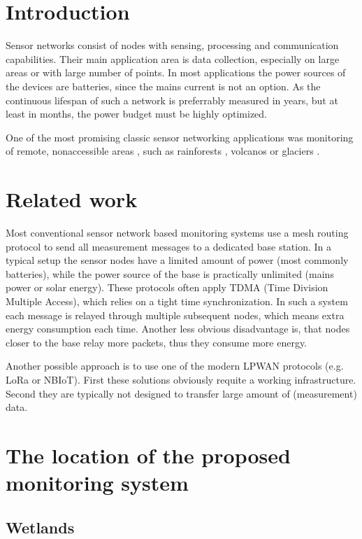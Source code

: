 \documentclass[conference]{IEEEtran}
\begin{document}
\section{Introduction}

Sensor networks consist of nodes with sensing, processing and communication
capabilities. Their main application area is data collection, especially
on large areas or with large number of points. In most applications
the power sources of the devices are batteries, since the mains current
is not an option. As the continuous lifespan of such a network is
preferrably measured in years, but at least in months, the power
budget must be highly optimized.

One of the most promising classic sensor networking applications was monitoring
of remote, nonaccessible areas \cite{corke2010}, such as rainforests
\cite{wark2008, cama2013}, volcanos \cite{werner2006, song2009} or glaciers
\cite{martinez2004, martinez2005}. 

\section{Related work}

Most conventional sensor network based monitoring
systems use a mesh routing protocol to
send all measurement messages to a dedicated base
station. In a typical setup the sensor nodes have
a limited amount of power (most commonly batteries),
while the power source of the base is practically
unlimited (mains power or solar energy). These protocols
often apply TDMA (Time Division Multiple Access),
which relies on a tight time synchronization.
In such a system each message is relayed through
multiple subsequent nodes, which means extra energy
consumption each time. Another less obvious
disadvantage is, that nodes closer to the base
relay more packets, thus they consume more energy.

Another possible approach is to use one of the
modern LPWAN protocols (e.g. LoRa \cite{erturk2019,
migabo2017} or NBIoT).
First these solutions obviously requite a working
infrastructure. Second they are typically not
designed to transfer large amount of (measurement)
data.

\section{The location of the proposed monitoring system}

\subsection{Wetlands}
\end{document}
